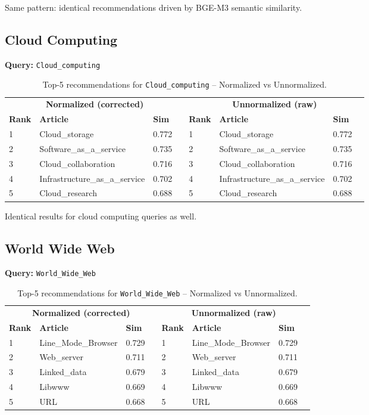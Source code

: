 \documentclass[12pt,a4paper]{article}
\begin{document}
Same pattern: identical recommendations driven by BGE-M3 semantic similarity.

\subsection{Cloud Computing}

\textbf{Query:} \texttt{Cloud\_computing}

\begin{table}[H]
\centering
\caption{Top-5 recommendations for \texttt{Cloud\_computing} -- Normalized vs Unnormalized.}
\label{tab:cloud}
\begin{tabular}{lllr|lllr}
\toprule
\multicolumn{4}{c}{\textbf{Normalized (corrected)}} & \multicolumn{4}{c}{\textbf{Unnormalized (raw)}} \\
\cmidrule(lr){1-4}\cmidrule(lr){5-8}
\textbf{Rank} & \textbf{Article} & \textbf{Sim} & & \textbf{Rank} & \textbf{Article} & \textbf{Sim} \\
\midrule
1 & Cloud\_storage & 0.772 & & 1 & Cloud\_storage & 0.772 \\
2 & Software\_as\_a\_service & 0.735 & & 2 & Software\_as\_a\_service & 0.735 \\
3 & Cloud\_collaboration & 0.716 & & 3 & Cloud\_collaboration & 0.716 \\
4 & Infrastructure\_as\_a\_service & 0.702 & & 4 & Infrastructure\_as\_a\_service & 0.702 \\
5 & Cloud\_research & 0.688 & & 5 & Cloud\_research & 0.688 \\
\bottomrule
\end{tabular}
\end{table}

Identical results for cloud computing queries as well.

\subsection{World Wide Web}

\textbf{Query:} \texttt{World\_Wide\_Web}

\begin{table}[H]
\centering
\caption{Top-5 recommendations for \texttt{World\_Wide\_Web} -- Normalized vs Unnormalized.}
\label{tab:www}
\begin{tabular}{lllr|lllr}
\toprule
\multicolumn{4}{c}{\textbf{Normalized (corrected)}} & \multicolumn{4}{c}{\textbf{Unnormalized (raw)}} \\
\cmidrule(lr){1-4}\cmidrule(lr){5-8}
\textbf{Rank} & \textbf{Article} & \textbf{Sim} & & \textbf{Rank} & \textbf{Article} & \textbf{Sim} \\
\midrule
1 & Line\_Mode\_Browser & 0.729 & & 1 & Line\_Mode\_Browser & 0.729 \\
2 & Web\_server & 0.711 & & 2 & Web\_server & 0.711 \\
3 & Linked\_data & 0.679 & & 3 & Linked\_data & 0.679 \\
4 & Libwww & 0.669 & & 4 & Libwww & 0.669 \\
5 & URL & 0.668 & & 5 & URL & 0.668 \\
\bottomrule
\end{tabular}
\end{table}
\end{document}
